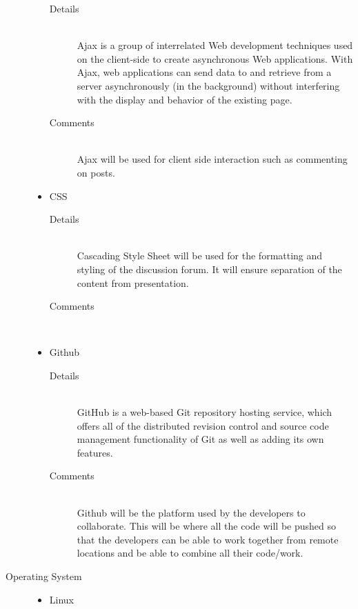 \documentclass[10pt]{article}
\begin{document}
\begin{description}
\begin{itemize}
\begin{description}
						\item[Details] \hfill \\
							Ajax is a group of interrelated Web development techniques used on the client-side to create asynchronous Web applications.
							 With Ajax, web applications can send data to and retrieve from a server asynchronously (in the background) without interfering
							 with the display and behavior of the existing page.
						\item[Comments]\hfill \\
                                                        Ajax will be used for client side interaction such as commenting on posts.
					\end{description}
				\item CSS
					\begin{description}
						\item[Details] \hfill \\
							Cascading Style Sheet will be used for the formatting and styling of the discussion forum. It will ensure separation of the content from presentation.
						\item[Comments]\hfill \\
					\end{description}	
				\item Github
					\begin{description}
						\item[Details] \hfill \\
                                                        GitHub is a web-based Git repository hosting service, which offers all of the distributed revision control and source code management functionality of Git as well as adding its own features.
                                                \item[Comments]\hfill \\
                                                        Github will be the platform used by the developers to collaborate. This will be where all the code will be pushed so that the developers can be able to work together from remote locations and be able to combine all their code/work.
					\end{description}
			\end{itemize}	
		\item[Operating System] \hfill 
			\begin{itemize}
				\item Linux
					\begin{description}

\end{description}
\end{itemize}
\end{description}
\end{document}
